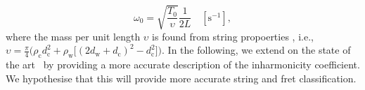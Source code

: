 \documentclass{article}
\begin{document}
\begin{sloppy}
\begin{equation}
    \omega_0 = \sqrt{\frac{T_0}{ \upsilon}} \frac{1}{2L} \quad [\text{s}^{-1}],
\end{equation}
where the mass per unit length $\upsilon$ is found from string propoerties \cite{firth1984}, i.e.,
    $\upsilon = \frac{\pi}{4}\Big(\rho_\text{c}d_\text{c}^2 + \rho_\text{w}\big[(2d_\text{w}+d_\text{c})^2-d_\text{c}^2\big]\Big)$. %
In the following, we extend on the state of the art~\cite{rossing:science_of_string_instruments} by providing a more accurate description of %
the inharmonicity coefficient. We hypothesise that this will provide more accurate string and fret classification. %
%
%

\end{sloppy}
\end{document}
